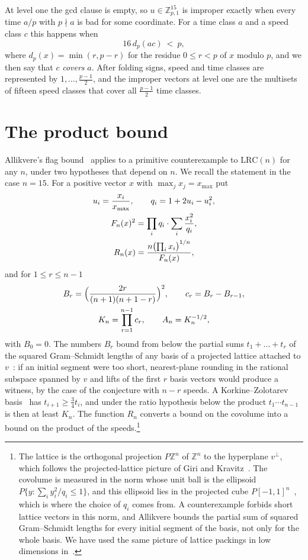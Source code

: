 \documentclass[11pt]{amsart}
\theoremstyle{definition}
\theoremstyle{remark}
\newcommand{\Z}{\mathbb{Z}}
\newcommand{\LRC}{\mathrm{LRC}}
\begin{document}
At level one the gcd clause is empty, so $u\in\Z_{p,1}^{15}$ is improper
exactly when every time $a/p$ with $p\nmid a$ is bad for some coordinate. For
a time class $a$ and a speed class $c$ this happens when
\begin{equation}\label{eq:cover}
 16\,d_p(ac)\ <\ p,
\end{equation}
where $d_p(x)=\min(r,p-r)$ for the residue $0\le r<p$ of $x$ modulo $p$,
and we then say that $c$ \emph{covers} $a$. After folding signs, speed and
time classes are represented by $1,\dots,\frac{p-1}2$, and the improper
vectors at level one are the multisets of fifteen speed classes that cover
all $\frac{p-1}2$ time classes.

\section{The product bound}\label{sec:shape}

Allikvere's flag bound~\cite[Theorem~3.8]{All26} applies to a primitive
counterexample to $\LRC(n)$ for any $n$, under two hypotheses that depend on
$n$. We recall the statement in the case $n=15$. For a positive vector
$x$ with $\max_jx_j=x_{\max}$ put
\begin{gather}
 u_i=\frac{x_i}{x_{\max}},\qquad q_i=1+2u_i-u_i^2,\notag\\
 F_n(x)^2=\prod_iq_i\cdot\sum_i\frac{x_i^2}{q_i},\notag\\
 R_n(x)=\frac{n\bigl(\prod_ix_i\bigr)^{1/n}}{F_n(x)},\label{eq:R}
\end{gather}
and for $1\le r\le n-1$
\begin{gather*}
 B_r=\Bigl(\frac{2r}{(n+1)(n+1-r)}\Bigr)^2,\qquad c_r=B_r-B_{r-1},\\
 K_n=\prod_{r=1}^{n-1}c_r,\qquad A_n=K_n^{-1/2},
\end{gather*}
with $B_0=0$. The numbers $B_r$ bound from below the partial sums
$t_1+\dots+t_r$ of the squared Gram--Schmidt lengths of any basis of a
projected lattice attached to $v$~\cite[Proposition~3.4]{All26}: if an
initial segment were too short, nearest-plane rounding in the rational
subspace spanned by $v$ and lifts of the first $r$ basis vectors would
produce a witness, by the case of the conjecture with $n-r$ speeds. A
Korkine--Zolotarev basis~\cite{KZ1873,LLS90} has $t_{i+1}\ge\frac34t_i$,
and under the ratio hypothesis below the product $t_1\cdots t_{n-1}$ is
then at least $K_n$. The function $R_n$
converts a bound on the covolume into a bound on the product of the
speeds.\footnote{The lattice is the orthogonal projection $P\Z^n$ of
$\Z^n$ to the hyperplane $v^\perp$, which follows the projected-lattice
picture of Giri and Kravitz~\cite{GK26}. The covolume is measured in the
norm whose unit ball is the ellipsoid $P\{y:\sum_iy_i^2/q_i\le1\}$, and
this ellipsoid lies in the projected cube $P[-1,1]^n$~\cite[Lemma~3.1]{All26},
which is where the choice of $q_i$ comes from. A counterexample forbids
short lattice vectors in this norm, and Allikvere bounds the partial sum
of squared Gram--Schmidt lengths for every initial segment of the basis,
not only for the whole basis. We have used the same picture of
lattice packings in low dimensions
in~\cite{BBB26a,BBB26b}.}
\end{document}
